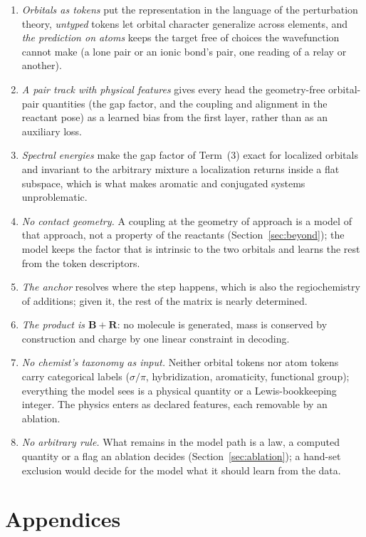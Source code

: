 \documentclass[11pt,a4paper]{article}
\newcommand{\vb}[1]{\bm{#1}}
\begin{document}
\begin{enumerate}[nosep]
\item \emph{Orbitals as tokens} put the representation in the language of the perturbation theory, \emph{untyped} tokens let orbital character generalize across elements, and \emph{the prediction on atoms} keeps the target free of choices the wavefunction cannot make (a lone pair or an ionic bond's pair, one reading of a relay or another).
\item \emph{A pair track with physical features} gives every head the geometry-free orbital-pair quantities (the gap factor, and the coupling and alignment in the reactant pose) as a learned bias from the first layer, rather than as an auxiliary loss.
\item \emph{Spectral energies} make the gap factor of Term~(3) exact for localized orbitals and invariant to the arbitrary mixture a localization returns inside a flat subspace, which is what makes aromatic and conjugated systems unproblematic.
\item \emph{No contact geometry.} A coupling at the geometry of approach is a model of that approach, not a property of the reactants (Section~\ref{sec:beyond}); the model keeps the factor that is intrinsic to the two orbitals and learns the rest from the token descriptors.
\item \emph{The anchor} resolves where the step happens, which is also the regiochemistry of additions; given it, the rest of the matrix is nearly determined.
\item \emph{The product is $\vb{B}+\vb{R}$}: no molecule is generated, mass is conserved by construction and charge by one linear constraint in decoding.
\item \emph{No chemist's taxonomy as input.} Neither orbital tokens nor atom tokens carry categorical labels ($\sigma/\pi$, hybridization, aromaticity, functional group); everything the model sees is a physical quantity or a Lewis-bookkeeping integer. The physics enters as declared features, each removable by an ablation.
\item \emph{No arbitrary rule.} What remains in the model path is a law, a computed quantity or a flag an ablation decides (Section~\ref{sec:ablation}); a hand-set exclusion would decide for the model what it should learn from the data.
\end{enumerate}

\appendix
\part*{Appendices}
\end{document}
